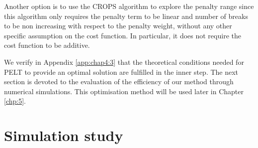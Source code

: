 Another option is to use the CROPS algorithm to explore the penalty range since this algorithm only requires the penalty term to be linear and number of breaks to be non increasing with respect to the penalty weight, without any other specific assumption on the cost function. In particular, it does not require the cost function to be additive. 
\newline
\newline

We verify in Appendix \ref{app:chap4:3} that the theoretical conditions needed for PELT to provide an optimal solution are fulfilled in the inner step. The next section is devoted to the evaluation of the efficiency of our method through numerical simulations. This optimisation method will be used later in Chapter \ref{chp:5}.





\section{Simulation study}\label{chp:4:4}



